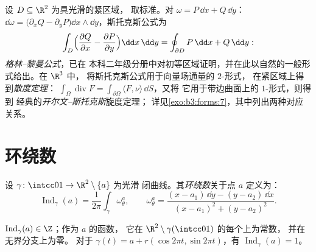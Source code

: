 \begin{example}[经典定理]
\label{ex:b3:forms:classical}
设 $D \subseteq \R^2$ 为具光滑的紧区域，
取标准。对 $\omega = P\,\dd x +
Q\,\dd y$：$\dd\omega = \bigl(\partial_xQ -
\partial_yP\bigr)\dd x\wedge\dd y$，斯托克斯公式为
\[
\int_D\Bigl(\frac{\partial Q}{\partial x} -
\frac{\partial P}{\partial y}\Bigr)\dd x\,\dd y
= \oint_{\partial D}P\,\dd x + Q\,\dd y :
\]
\emph{格林--黎曼公式}，已在
本科二年级分册中对初等区域证明，并在此以自然的一般形式给出。在 $\R^3$ 中，
将斯托克斯公式用于向量场通量的 $2$-形式，
在紧区域上得到\emph{散度定理}：
$\int_\Omega\operatorname{div}F =
\int_{\partial\Omega}\langle F, \nu\rangle\,\dd S$，又将
它用于带边曲面上的 $1$-形式，则得到
经典的\emph{开尔文--斯托克斯}旋度定理；
详见\cref{exo:b3:forms:7}，其中列出两种对应关系。
\end{example}

\section{环绕数}\label{sec:b3:forms:winding}

\begin{definition}\label{def:b3:forms:winding}
设 $\gamma\colon\intcc01\to\R^2\setminus\{a\}$ 为光滑
闭曲线。其\emph{环绕数}关于点 $a$ 定义为：
\[
\operatorname{Ind}_\gamma(a) =
\frac1{2\pi}\int_\gamma\omega_\theta^a,
\qquad
\omega_\theta^a = \frac{(x - a_1)\,\dd y - (y - a_2)\,\dd
x}{(x - a_1)^2 + (y - a_2)^2} .
\]
\end{definition}

\begin{proposition}\label{prop:b3:forms:windinginteger}
$\operatorname{Ind}_\gamma(a) \in \Z$；作为 $a$ 的函数，
它在 $\R^2\setminus\gamma(\intcc01)$ 的每个上为常数，
并在无界分支上为零。
对于 $\gamma(t) = a + r(\cos2\pi t, \sin2\pi t)$，有
$\operatorname{Ind}_\gamma(a) = 1$。
\end{proposition}

